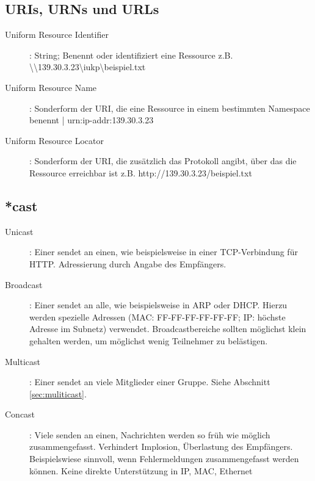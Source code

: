 \documentclass{article} %
\begin{document}
\subsection{URIs, URNs und URLs}
\begin{description}
\item [Uniform Resource Identifier]: String; Benennt oder identifiziert eine Ressource z.B.  \textbackslash\textbackslash139.30.3.23\textbackslash iukp\textbackslash beispiel.txt
\item [Uniform Resource Name]: Sonderform der URI, die eine Ressource in einem bestimmten
Namespace benennt | urn:ip-addr:139.30.3.23
\item [Uniform Resource Locator]: Sonderform der URI, die zusätzlich das Protokoll angibt, über das die Ressource erreichbar ist z.B. http://139.30.3.23/beispiel.txt
\end{description}
\subsection{*cast} 
\begin{description}
	\item[Unicast]: Einer sendet an einen, wie beispielsweise in einer TCP-Verbindung für HTTP. Adressierung durch Angabe des Empfängers.
	\item[Broadcast]: Einer sendet an alle, wie beispielsweise in ARP oder DHCP. Hierzu werden spezielle Adressen (MAC: FF-FF-FF-FF-FF-FF; IP: höchste Adresse im Subnetz) verwendet. Broadcastbereiche sollten möglichst klein gehalten werden, um möglichst wenig Teilnehmer zu belästigen.
	\item[Multicast]: Einer sendet an viele Mitglieder einer Gruppe. Siehe Abschnitt \ref{sec:muliticast}.
	\item[Concast]: Viele senden an einen, Nachrichten werden so früh wie möglich zusammengefasst. Verhindert Implosion, Überlastung des Empfängers. Beispielswiese sinnvoll, wenn Fehlermeldungen zusammengefasst werden können. Keine direkte Unterstützung in IP, MAC, Ethernet
\end{description}
\end{document}
